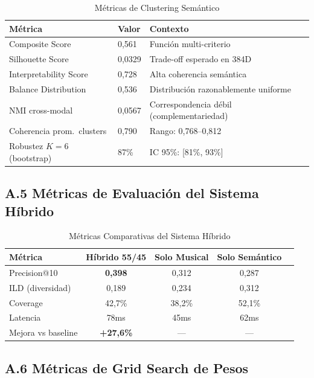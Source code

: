 \begin{table}[htbp]
\centering
\caption{Métricas de Clustering Semántico}
\label{tab:metricas-clustering}
\begin{tabular}{lll}
\toprule
\textbf{Métrica} & \textbf{Valor} & \textbf{Contexto} \\
\midrule
Composite Score & 0,561 & Función multi-criterio \\
Silhouette Score & 0,0329 & Trade-off esperado en 384D \\
Interpretability Score & 0,728 & Alta coherencia semántica \\
Balance Distribution & 0,536 & Distribución razonablemente uniforme \\
NMI cross-modal & 0,0567 & Correspondencia débil (complementariedad) \\
Coherencia prom.\ clusters & 0,790 & Rango: 0,768--0,812 \\
Robustez $K=6$ (bootstrap) & 87\% & IC 95\%: [81\%, 93\%] \\
\bottomrule
\end{tabular}
\end{table}

\subsection*{A.5 Métricas de Evaluación del Sistema Híbrido}

\begin{table}[htbp]
\centering
\caption{Métricas Comparativas del Sistema Híbrido}
\label{tab:metricas-hibrido}
\begin{tabular}{lcccc}
\toprule
\textbf{Métrica} & \textbf{Híbrido 55/45} & \textbf{Solo Musical} & \textbf{Solo Semántico} \\
\midrule
Precision@10 & \textbf{0,398} & 0,312 & 0,287 \\
ILD (diversidad) & 0,189 & 0,234 & 0,312 \\
Coverage & 42,7\% & 38,2\% & 52,1\% \\
Latencia & 78ms & 45ms & 62ms \\
Mejora vs baseline & \textbf{+27,6\%} & --- & --- \\
\bottomrule
\end{tabular}
\end{table}

\subsection*{A.6 Métricas de Grid Search de Pesos}

